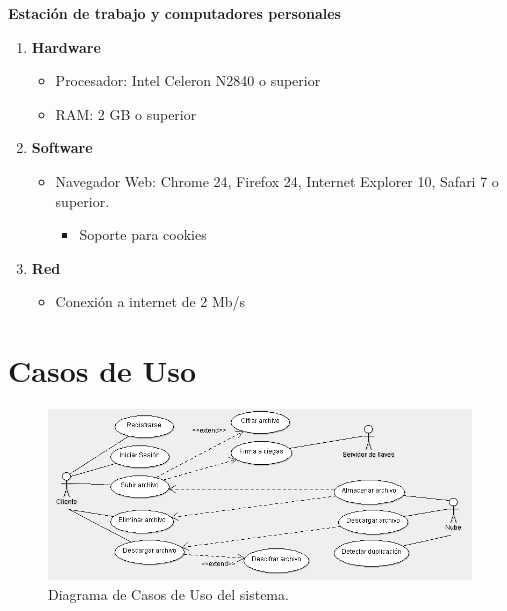 \textbf{Estación de trabajo y computadores personales}
\begin{enumerate}
\item \textbf{Hardware}
\begin{itemize}
\item Procesador: Intel Celeron N2840 o superior
\item RAM: 2 GB o superior
\end{itemize}
\item \textbf{Software}
\begin{itemize}
\item Navegador Web: Chrome 24, Firefox 24, Internet Explorer 10, Safari 7 o superior.
\begin{itemize}
\item Soporte para cookies
\end{itemize}
\end{itemize}

\item \textbf{Red}
\begin{itemize}
\item Conexión a internet de 2 Mb/s
\end{itemize}

\end{enumerate}



\newpage
\section{Casos de Uso}

\begin{figure}[htbp!]
		\centering
			\includegraphics[width=1\textwidth]{images/CasosDeUso}
		\caption{Diagrama de Casos de Uso del sistema.}
	\end{figure}

\newpage
